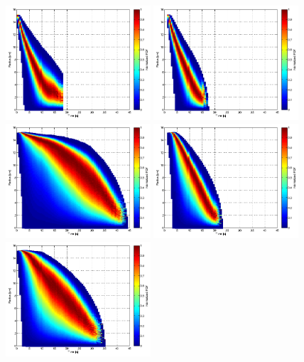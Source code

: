 \documentclass[12pt]{article}
\begin{document}
\begin{figure}[H]
\includegraphics[width=0.48\textwidth]{Figures/pdf_radius_d1}
\includegraphics[width=0.48\textwidth]{Figures/pdf_radius_f1}\\
\includegraphics[width=0.48\textwidth]{Figures/pdf_radius_d2}
\includegraphics[width=0.48\textwidth]{Figures/pdf_radius_f2}\\
\includegraphics[width=0.48\textwidth]{Figures/pdf_radius_d3}

\end{figure}
\end{document}
